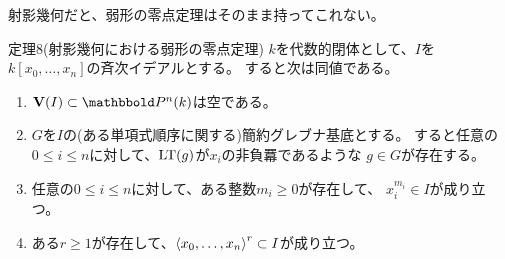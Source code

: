 射影幾何だと、弱形の零点定理はそのまま持ってこれない。
\begin{framed}
  定理8(射影幾何における弱形の零点定理)
  $k$を代数的閉体として、$I$を$k[x_0,\dots,x_n]$の斉次イデアルとする。
  すると次は同値である。
  \begin{enumerate}[label=(\roman*)]
    \item $\var(I)\subset \P^n(k)$は空である。
    \item $G$を$I$の(ある単項式順序に関する)簡約グレブナ基底とする。
    すると任意の$0\le i \le n$に対して、${\rm LT}(g)$が$x_i$の非負羃であるような
    $g\in G$が存在する。
    \item
    任意の$0\le i \le n$に対して、ある整数$m_i \ge 0$が存在して、
    $x_i^{m_i} \in I$が成り立つ。
    \item
    ある$r\ge 1$が存在して、$\left\langle x_0,\dots,x_n \right\rangle^r \subset I$が成り立つ。
  \end{enumerate}
\end{framed}
